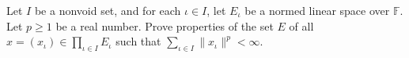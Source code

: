Let $I$ be a nonvoid set, and for each $\iota \in I$, let $E_\iota$ be a normed linear space over $\mathbb{F}$. Let $p \geq 1$ be a real number. Prove properties of the set $E$ of all $x = (x_\iota) \in \prod_{\iota \in I} E_\iota$ such that $\sum_{\iota \in I} \|x_\iota\|^p < \infty$.
